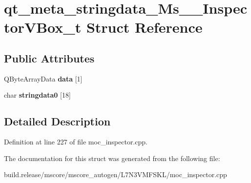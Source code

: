 \hypertarget{structqt__meta__stringdata___ms_____inspector_v_box__t}{}\section{qt\+\_\+meta\+\_\+stringdata\+\_\+\+Ms\+\_\+\+\_\+\+Inspector\+V\+Box\+\_\+t Struct Reference}
\label{structqt__meta__stringdata___ms_____inspector_v_box__t}
\subsection*{Public Attributes}
\begin{DoxyCompactItemize}
\item 
\mbox{\label{structqt__meta__stringdata___ms_____inspector_v_box__t_add961d77fbc90bc6c7dc96704d099058}} 
Q\+Byte\+Array\+Data {\bfseries data} \mbox{[}1\mbox{]}
\item 
\mbox{\label{structqt__meta__stringdata___ms_____inspector_v_box__t_a5fce8b49764ec6c5eda92919a34bbc92}} 
char {\bfseries stringdata0} \mbox{[}18\mbox{]}
\end{DoxyCompactItemize}


\subsection{Detailed Description}


Definition at line 227 of file moc\+\_\+inspector.\+cpp.



The documentation for this struct was generated from the following file\+:\begin{DoxyCompactItemize}
\item 
build.\+release/mscore/mscore\+\_\+autogen/\+L7\+N3\+V\+M\+F\+S\+K\+L/moc\+\_\+inspector.\+cpp\end{DoxyCompactItemize}
